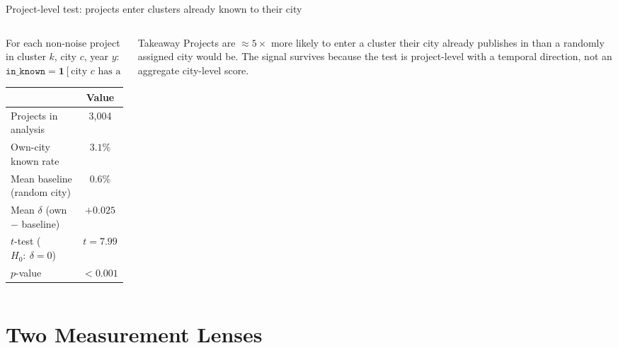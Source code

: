 \documentclass[10pt,aspectratio=169]{beamer}
\begin{document}
\begin{frame}{Project-level test: projects enter clusters already known to their city}
	\begin{columns}[T]
		\begin{column}{0.54\textwidth}
			For each non-noise project in cluster $k$, city $c$, year $y$:\\[0.4em]
			$\texttt{in\_known} = \mathbf{1}[\text{city } c \text{ has a paper in cluster } k \text{ before year } y]$\\[0.5em]
			\begin{tabular}{lc}
				\toprule
				& Value \\
				\midrule
				Projects in analysis & 3{,}004 \\
				Own-city known rate  & $3.1\%$ \\
				Mean baseline (random city) & $0.6\%$ \\
				Mean $\delta$ (own $-$ baseline) & $+0.025$ \\
				\midrule
				$t$-test ($H_0{:}\ \delta = 0$) & $t = 7.99$ \\
				$p$-value & $< 0.001$ \\
				\bottomrule
			\end{tabular}
		\end{column}
		\begin{column}{0.43\textwidth}
			\vspace{0.3em}
			\begin{block}{Takeaway}
				Projects are $\approx 5\times$ more likely to enter a cluster their city already publishes in than a randomly assigned city would be. The signal survives because the test is project-level with a temporal direction, not an aggregate city-level score.
			\end{block}
		\end{column}
	\end{columns}
\end{frame}


\section{Two Measurement Lenses}
\end{document}
